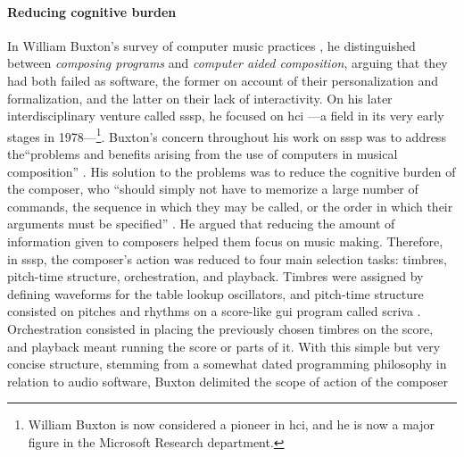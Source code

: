 \paragraph{Reducing cognitive burden}
In William Buxton's survey of computer music practices \parencites{Bux77:Aco}{icmc/bbp2372.1978.012}{DBLP:conf/icmc/BuxtonPRB80}, he distinguished between \textit{composing programs} and \textit{computer aided composition}, arguing that they had both failed as software, the former on account of their personalization and formalization, and the latter on their lack of interactivity. On his later interdisciplinary venture called \gls{sssp}, he focused on \gls{hci} ---a field in its very early stages in 1978---\footnote{William Buxton is now considered a pioneer in \gls{hci}, and he is now a major figure in the Microsoft Research department.}. Buxton's concern throughout his work on \gls{sssp} was to address the``problems and benefits arising from the use of computers in musical composition'' \parencite[472]{DBLP:conf/icmc/BuxtonFBRSCM78}. His solution to the problems was to reduce the cognitive burden of the composer, who ``should simply not have to memorize a large number of commands, the sequence in which they may be called, or the order in which their arguments must be specified'' \parencite[474]{DBLP:conf/icmc/BuxtonFBRSCM78}. He argued that reducing the amount of information given to composers helped them focus on music making. Therefore, in \gls{sssp}, the composer's action was reduced to four main selection tasks: timbres, pitch-time structure, orchestration, and playback. Timbres were assigned by defining waveforms for the table lookup oscillators, and pitch-time structure consisted on pitches and rhythms on a score-like \gls{gui} program called \gls{scriva} \parencite{youtube/buxton10}. Orchestration consisted in placing the previously chosen timbres on the score, and playback meant running the score or parts of it. With this simple but very concise structure, stemming from a somewhat dated programming philosophy in relation to audio software, Buxton delimited the scope of action of the composer

